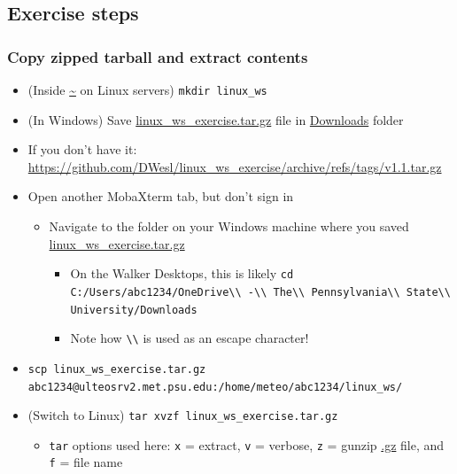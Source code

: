 \documentclass[hyperref,pdfa,unicode,utf8,usepdftitle]{beamer}
\begin{document}
\subsection{Exercise steps}

\begin{frame}
  \frametitle{Copy zipped tarball and extract contents}
  \begin{itemize}
  \item (Inside \url{~} on Linux servers) \lstinline{mkdir linux_ws}
  \item (In Windows) Save \url{linux_ws_exercise.tar.gz} file
    in \url{Downloads} folder
  \item If you don’t have
    it:
    \url{https://github.com/DWesl/linux_ws_exercise/archive/refs/tags/v1.1.tar.gz}
  \item Open another MobaXterm tab, but don’t sign in
    \begin{itemize}
    \item Navigate to the folder on your Windows machine where you
      saved \url{linux_ws_exercise.tar.gz}
      \begin{itemize}
      \item On the Walker Desktops, this is
        likely
        \lstinline{cd C:/Users/abc1234/OneDrive\\ -\\ The\\ Pennsylvania\\ State\\ University/Downloads}
      \item Note how \lstinline{\\} is used as an escape character!
      \end{itemize}
    \end{itemize}
  \item
    \lstinline{scp linux_ws_exercise.tar.gz abc1234@ulteosrv2.met.psu.edu:/home/meteo/abc1234/linux_ws/}
  \item (Switch to
    Linux) \lstinline{tar xvzf linux_ws_exercise.tar.gz}
    \begin{itemize}
    \item \lstinline{tar} options used here: \lstinline{x} =
      extract, \lstinline{v} = verbose, \lstinline{z} =
      gunzip \url{.gz} file, and \lstinline{f} = file name
    \end{itemize}
  \end{itemize}
\end{frame}
\end{document}
